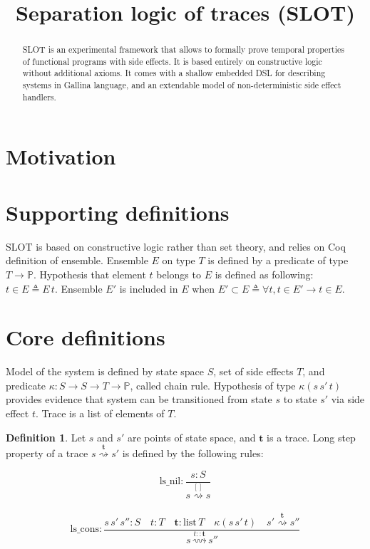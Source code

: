 \documentclass[10pt,letterpaper]{article}
\title{
		\huge Separation logic of traces (SLOT)
}
\newcommand \prop{\mathds{P}}
\newcommand \crpred[3]{\mathrel{\kappa\left(#1\,#2\,#3\right)}}
\newcommand \chain[3]{\mathrel{#1\stackrel{#3}{\rightsquigarrow}#2}}
\newcommand \bm[1]{\boldsymbol{#1}}
\theoremstyle{definition}
\newtheorem{definition}{Definition}
\begin{document}
\maketitle

\begin{abstract}
  SLOT is an experimental framework that allows to formally prove
  temporal properties of functional programs with side effects. It is
  based entirely on constructive logic without additional axioms. It
  comes with a shallow embedded DSL for describing systems in Gallina
  language, and an extendable model of non-deterministic side effect
  handlers.
\end{abstract}

\section{Motivation}

\section{Supporting definitions}

SLOT is based on constructive logic rather than set theory, and relies
on Coq definition of ensemble. Ensemble $E$ on type $T$ is defined by
a predicate of type $T \to \prop$. Hypothesis that element $t$ belongs
to $E$ is defined as following: $t \in E \triangleq E\, t$. Ensemble
$E'$ is included in $E$ when
$E' \subset E \triangleq \forall t, t \in E' \to t \in E$.

\section{Core definitions}

Model of the system is defined by state space $S$, set of side effects
$T$, and predicate $\mathrel{\kappa:S\to S\to T\to \prop}$, called
chain rule. Hypothesis of type $\crpred{s}{s'}{t}$ provides evidence that
system can be transitioned from state $s$ to state $s'$ via side
effect $t$. Trace is a list of elements of $T$.

\begin{definition}
  Let $s$ and $s'$ are points of state space, and $\bm{t}$ is a trace.
  Long step property of a trace $\chain{s}{s'}{\bm{t}}$ is defined by
  the following rules:

  \begin{equation}
    \text{ls\_nil}: \frac{s : S}{\chain{s}{s}{[]}}
  \end{equation}
  \\
  \begin{equation}
    \text{ls\_cons}:
    \frac{s\, s' \, s'' : S \quad  t : T \quad \bm{t} : \text{list}\,T \quad \crpred{s}{s'}{t} \quad \chain{s'}{s''}{\bm{t}}}
         {\chain{s}{s''}{t::\bm{t}}}
  \end{equation}
\end{definition}
\end{document}
